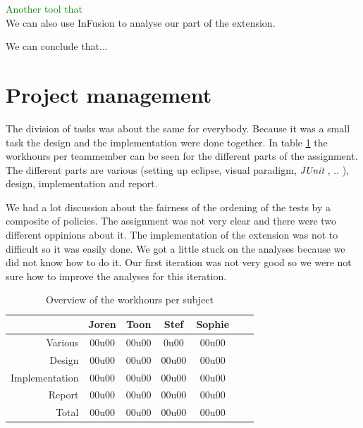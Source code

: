 \documentclass[i3]{oss}
\newcommand{\junit}{\emph{JUnit }}
\newcommand{\comment}[1]{{\huge \textcolor{green}{#1}}\\}
\begin{document}
\comment{Another tool that} 




We can also use InFusion to analyse our part of the extension.

We can conclude that...
\section{Project management}
\label{ssec:Projectmanag}

The division of tasks was about the same for everybody. Because it was a small task the design and the implementation were done together. In table \ref{tab:werkuren} the workhours per teammember can be seen for the different parts of the assignment. The different parts are various (setting up eclipse, visual paradigm, \junit, .. ), design, implementation and report. 

We had a lot discussion about the fairness of the ordening of the tests by a composite of policies. The assignment was not very clear and there were two different oppinions about it.  
The implementation of the extension was not to difficult so it was easily done.
We got a little stuck on the analyses because we did not know how to do it. Our first iteration was not very good so we were not sure how to improve the analyses for this iteration.





\begin{table}[h!]
\begin{center}
    \begin{tabular}{ r | c  c  c  c  c  c}
     & Joren & Toon & Stef & Sophie \\ \hline
    	Various & 		00u00 & 00u00 & 0u00 & 00u00\\
        Design & 		00u00 & 00u00 & 00u00 & 00u00 \\
        Implementation & 00u00 & 00u00 & 00u00 & 00u00\\
        Report & 		00u00 & 00u00 & 00u00 & 00u00 \\
        Total & 		00u00 & 00u00 & 00u00 & 00u00  
    \end{tabular}
    \caption{Overview of the workhours per subject}
    \label{tab:werkuren}
\end{center}
\end{table}
\end{document}
